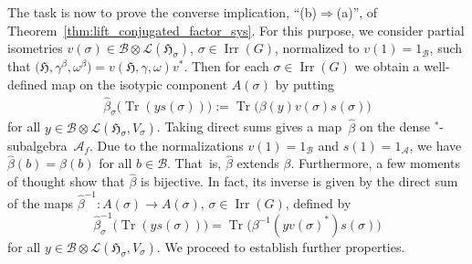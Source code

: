 \documentclass[11pt]{article}
\numberwithin{equation}{section}
\numberwithin{equation}{section}
\newcommand*{\tensor}{\otimes}		%
\DeclareMathOperator{\Tr}{Tr}		%
\newcommand*{\Star}{$^*$\nobreakdash}
\newcommand*{\hilb}{\mathfrak}		%
\newcommand*{\alg}{\mathcal}		%
\newcommand*{\hH}{\hilb{H}}			%
\newcommand*{\one}{1}				%
\newcommand*{\aA}{\alg{A}}			%
\newcommand*{\aB}{\alg{B}} 			%
\newcommand*{\End}{\mathcal{L}} %
\DeclareMathOperator{\Irrep}{Irr} 			%
\begin{document}
The task is now to prove the converse implication, ``(b)$\Rightarrow$(a)'', of Theorem~\ref{thm:lift_conjugated_factor_sys}.
For this purpose, we consider partial isometries $v(\sigma) \in \aB \tensor \End(\hH_\sigma)$, $\sigma \in \Irrep(G)$, normalized to $v(1) = \one_\aB$, such that $ \big(\hH, \gamma^\beta, \omega^\beta\big) = v (\hH, \gamma, \omega) v^*$.
Then for each $\sigma \in \Irrep(G)$ we obtain a well-defined map on the isotypic component $A(\sigma)$ by putting
\begin{gather}\label{eq:beta}
	\hat\beta_\sigma \bigl( \Tr (y s(\sigma)) \bigr) := \Tr \bigl( \beta(y) v(\sigma) s(\sigma) \bigr)
\end{gather}
for all $y\in \aB \tensor \End(\hH_\sigma, V_\sigma)$.
Taking direct sums gives a map~$\hat\beta$ on the dense \Star-subalgebra~$\aA_f$.
Due to the normalizations $v(1) = \one_\aB$ and $s(1) = \one_\aA$, we have $\hat \beta(b) = \beta(b)$ for all $b \in \aB$.
That~is, $\hat \beta$ extends $\beta$.
Furthermore, a few moments of thought show that $\hat \beta$ is bijective.
In fact, its inverse is given by the direct sum of the maps $\hat\beta^{-1}\colon A(\sigma) \to A(\sigma)$, $\sigma \in \Irrep(G)$, defined by
\[
\hat\beta^{-1}_\sigma \bigl(\Tr ( y s(\sigma)) \bigr)
	= \Tr \bigl( \beta^{-1} (y v(\sigma)^*) s(\sigma) \bigr)
\] for all $y \in \aB \tensor \End(\hH_\sigma, V_\sigma)$.
We proceed to establish further properties.
\end{document}
